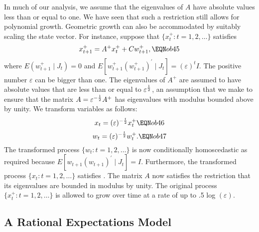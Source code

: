 In much of our analysis, we assume that the
eigenvalues of $A$ have absolute values less than or equal to one.
We have seen that such a restriction still allows for polynomial growth.
Geometric growth can also be accommodated by suitably scaling the state
vector.  For instance, suppose that $\{x_t^+ : t=1,2,\ldots\}$
satisfies
$$x_{t+1}^+ = A^+ x_t^+ + C w_{t+1}^+ , \EQN ob45 $$
where $E(w_{t+1}^+ \mid J_t) = 0$ and $E[w_{t+1}^+ (w_{t+1}^+)^\prime \mid
J_t] = (\varepsilon)^t I$.  The positive number $\varepsilon$ can be bigger
than one.  The eigenvalues of $A^+$ are assumed to have absolute values that
are less than or equal to $\varepsilon^{1\over 2}$, an assumption that we make
to ensure that the matrix $A = \varepsilon^{- {1\over 2}} A^+$  has eigenvalues with
modulus bounded above by unity.  We transform variables as follows:
$$x_t = (\varepsilon)^{- {t\over 2}} x_t^+ \EQN ob46 $$
$$w_t = (\varepsilon)^{- {t\over 2}} w_t^+ . \EQN ob47 $$
The transformed process $\{w_t : t=1,2,\ldots\}$ is now conditionally
homoscedastic as required because $E[w_{t+1}(w_{t+1})^\prime \mid J_t] = I$.
Furthermore, the transformed process $\{x_t : t=1,2,\ldots\}$ satisfies
.
 The matrix $A$ now satisfies the
restriction that its eigenvalues are bounded in modulus by unity.  The original
process $\{x_t^+ : t=1,2,\ldots\}$ is allowed to grow over time at a rate of up
to .5 log $(\varepsilon)$.

\subsection
{A Rational Expectations Model}

